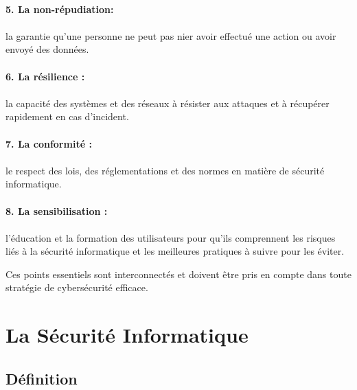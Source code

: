 \paragraph{5. La non-répudiation: } \paragraph{}la garantie qu'une personne ne peut pas nier avoir effectué une action ou avoir envoyé des données.

\paragraph{6. La résilience :} \paragraph{}la capacité des systèmes et des réseaux à résister aux attaques et à récupérer rapidement en cas d'incident.
\pagebreak

\paragraph{7. La conformité :} \paragraph{}le respect des lois, des réglementations et des normes en matière de sécurité informatique.

\paragraph{8. La sensibilisation :}\paragraph{} l'éducation et la formation des utilisateurs pour qu'ils comprennent les risques liés à la sécurité informatique et les meilleures pratiques à suivre pour les éviter.

Ces points essentiels sont interconnectés et doivent être pris en compte dans toute stratégie de cybersécurité efficace.
\section{La Sécurité Informatique }
\subsection{Définition}
